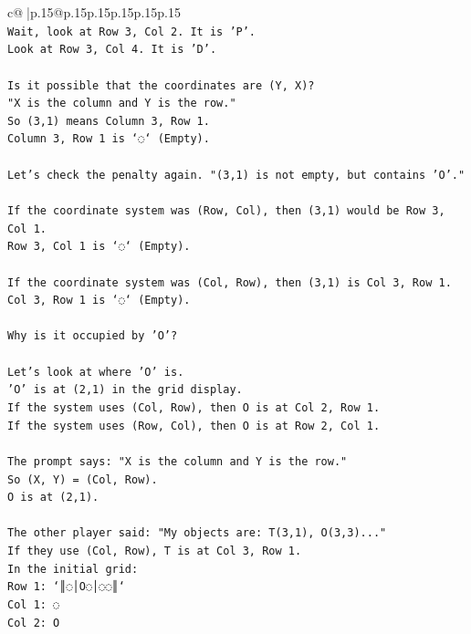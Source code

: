 \documentclass{article}
\begin{document}
{\begin{supertabular}{c@{$\;$}|p{.15\linewidth}@{}p{.15\linewidth}p{.15\linewidth}p{.15\linewidth}p{.15\linewidth}p{.15\linewidth}}
{{{\\ 
\texttt{Wait, look at Row 3, Col 2. It is 'P'.} \\
\texttt{Look at Row 3, Col 4. It is 'D'.} \\
\\ 
\texttt{Is it possible that the coordinates are (Y, X)?} \\
\texttt{"X is the column and Y is the row."} \\
\texttt{So (3,1) means Column 3, Row 1.} \\
\texttt{Column 3, Row 1 is `◌` (Empty).} \\
\\ 
\texttt{Let's check the penalty again. "(3,1) is not empty, but contains 'O'."} \\
\\ 
\texttt{If the coordinate system was (Row, Col), then (3,1) would be Row 3, Col 1.} \\
\texttt{Row 3, Col 1 is `◌` (Empty).} \\
\\ 
\texttt{If the coordinate system was (Col, Row), then (3,1) is Col 3, Row 1.} \\
\texttt{Col 3, Row 1 is `◌` (Empty).} \\
\\ 
\texttt{Why is it occupied by 'O'?} \\
\\ 
\texttt{Let's look at where 'O' is.} \\
\texttt{'O' is at (2,1) in the grid display.} \\
\texttt{If the system uses (Col, Row), then O is at Col 2, Row 1.} \\
\texttt{If the system uses (Row, Col), then O is at Row 2, Col 1.} \\
\\ 
\texttt{The prompt says: "X is the column and Y is the row."} \\
\texttt{So (X, Y) = (Col, Row).} \\
\texttt{O is at (2,1).} \\
\\ 
\texttt{The other player said: "My objects are: T(3,1), O(3,3)..."} \\
\texttt{If they use (Col, Row), T is at Col 3, Row 1.} \\
\texttt{In the initial grid:} \\
\texttt{Row 1: `║◌│O◌│◌◌║`} \\
\texttt{Col 1: ◌} \\
\texttt{Col 2: O} \\
}}}
\end{supertabular}}
\end{document}
